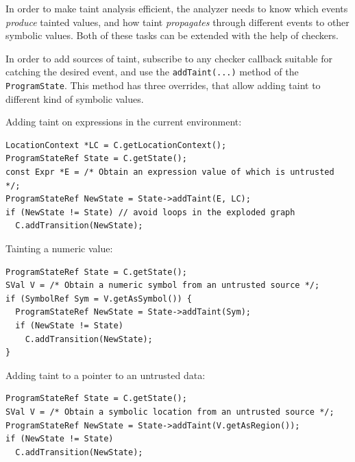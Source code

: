 \documentclass[a4paper,12pt]{article}
\newenvironment{nobr}{\begin{minipage}{\textwidth}\setlength\parskip{1em}
}{\end{minipage}\ignorespacesafterend}
\begin{document}
In order to make taint analysis efficient, the analyzer needs to know which events \emph{produce} tainted values, and how taint \emph{propagates} through different events to other symbolic values. Both of these tasks can be extended with the help of checkers.

In order to add sources of taint, subscribe to any checker callback suitable for catching the desired event, and use the \lstinline|addTaint(...)| method of the \lstinline|ProgramState|. This method has three overrides, that allow adding taint to different kind of symbolic values.

\begin{nobr}
Adding taint on expressions in the current environment:

\begin{lstlisting}[style=cplusplus,numbers=none]
LocationContext *LC = C.getLocationContext();
ProgramStateRef State = C.getState();
const Expr *E = /* Obtain an expression value of which is untrusted */;
ProgramStateRef NewState = State->addTaint(E, LC);
if (NewState != State) // avoid loops in the exploded graph
  C.addTransition(NewState);
\end{lstlisting}
\end{nobr}

\begin{nobr}
Tainting a numeric value:

\begin{lstlisting}[style=cplusplus,numbers=none]
ProgramStateRef State = C.getState();
SVal V = /* Obtain a numeric symbol from an untrusted source */;
if (SymbolRef Sym = V.getAsSymbol()) {
  ProgramStateRef NewState = State->addTaint(Sym);
  if (NewState != State)
    C.addTransition(NewState);
}
\end{lstlisting}
\end{nobr}

\begin{nobr}
Adding taint to a pointer to an untrusted data:

\begin{lstlisting}[style=cplusplus,numbers=none]
ProgramStateRef State = C.getState();
SVal V = /* Obtain a symbolic location from an untrusted source */;
ProgramStateRef NewState = State->addTaint(V.getAsRegion());
if (NewState != State)
  C.addTransition(NewState);
\end{lstlisting}
\end{nobr}
\end{document}

